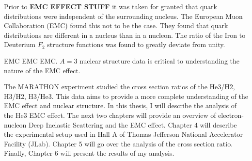 Prior to \textbf{EMC EFFECT STUFF} it was taken for granted that quark distributions were independent of the surrounding nucleus. The European Muon Collaboration (EMC) found this not to be the case. They found that quark distributions are different in a nucleus than in a nucleon. The ratio of the Iron to Deuterium $F_2$ structure functions was found to greatly deviate from unity.

EMC EMC EMC. $A=3$ nuclear structure data is critical to understanding the nature of the EMC effect.

The MARATHON experiment studied the cross section ratios of the He3/H2, H3/H2, H3/He3. This data aims to provide a more complete understanding of the EMC effect and nuclear structure. In this thesis, I will describe the analysis of the He3 EMC effect. The next two chapters will provide an overview of electron-nucleon Deep Inelastic Scattering and the EMC effect. Chapter 4 will describe the experimental setup used in Hall A of Thomas Jefferson National Accelerator Facility (JLab). Chapter 5 will go over the analysis of the cross section ratio. Finally, Chapter 6 will present the results of my analysis.